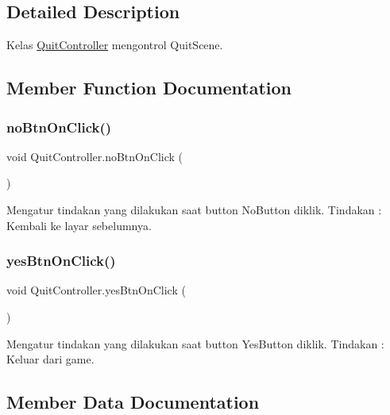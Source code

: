 \subsection{Detailed Description}
Kelas \hyperlink{class_quit_controller}{Quit\+Controller} mengontrol Quit\+Scene. 



\subsection{Member Function Documentation}
\hypertarget{class_quit_controller_aa0339f4778f5e947a0f1a041734757f0}{}\label{class_quit_controller_aa0339f4778f5e947a0f1a041734757f0} 
\subsubsection{\texorpdfstring{no\+Btn\+On\+Click()}{noBtnOnClick()}}
{\footnotesize\ttfamily void Quit\+Controller.\+no\+Btn\+On\+Click (\begin{DoxyParamCaption}{ }\end{DoxyParamCaption})}



Mengatur tindakan yang dilakukan saat button No\+Button diklik. Tindakan \+: Kembali ke layar sebelumnya. 

\hypertarget{class_quit_controller_a3f4f0e9b67108e4a0608f4c2085cac84}{}\label{class_quit_controller_a3f4f0e9b67108e4a0608f4c2085cac84} 
\subsubsection{\texorpdfstring{yes\+Btn\+On\+Click()}{yesBtnOnClick()}}
{\footnotesize\ttfamily void Quit\+Controller.\+yes\+Btn\+On\+Click (\begin{DoxyParamCaption}{ }\end{DoxyParamCaption})}



Mengatur tindakan yang dilakukan saat button Yes\+Button diklik. Tindakan \+: Keluar dari game. 



\subsection{Member Data Documentation}
\hypertarget{class_quit_controller_a988a4085bd05debd186ee7475e758404}{}\label{class_quit_controller_a988a4085bd05debd186ee7475e758404} 
